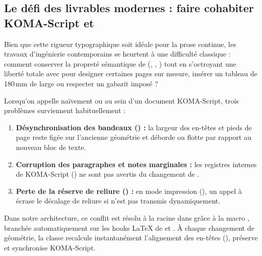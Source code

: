 \subsection{Le défi des livrables modernes : faire cohabiter KOMA-Script et }
Bien que cette rigueur typographique soit idéale pour la prose continue,
les travaux d'ingénierie contemporains se heurtent à une difficulté classique :
comment conserver la propreté sémantique de  (, , )
tout en s'octroyant une liberté totale avec  pour designer certaines pages sur mesure,
insérer un tableau de 180\,mm de large ou respecter un gabarit imposé ?

Lorsqu'on appelle naïvement  ou  au sein d'un document KOMA-Script, trois problèmes surviennent habituellement :
\begin{enumerate}
  \item \textbf{Désynchronisation des bandeaux () :}
  la largeur des en-têtes et pieds de page reste figée sur l'ancienne géométrie et déborde ou flotte par rapport au nouveau bloc de texte.
  \item \textbf{Corruption des paragraphes et notes marginales :}
  les registres internes de KOMA-Script () ne sont pas avertis du changement de .
  \item \textbf{Perte de la réserve de reliure () :}
  en mode impression (\code{[print]}), un appel à  écrase le décalage de reliure si  n'est pas transmis dynamiquement.
\end{enumerate}

Dans notre architecture, ce conflit est résolu à la racine dans  grâce à la macro , branchée automatiquement sur les hooks \LaTeX{} de  et .
À chaque changement de géométrie, la classe recalcule instantanément l'alignement des en-têtes (), préserve  et synchronise KOMA-Script.

